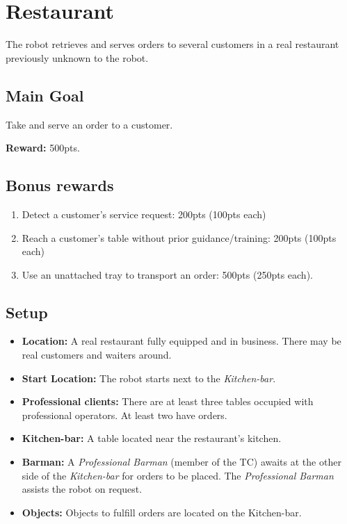 \section{Restaurant}
The robot retrieves and serves orders to several customers in a real restaurant previously unknown to the robot.


\subsection{Main Goal}
Take and serve an order to a customer.

\noindent\textbf{Reward:} 500pts.

\subsection{Bonus rewards}
\begin{enumerate}[nosep]
	\item Detect a customer's service request: 200pts (100pts each)
	\item Reach a customer's table without prior guidance/training: 200pts (100pts each)
	\item Use an unattached tray to transport an order: 500pts (250pts each).
\end{enumerate}

\subsection{Setup}
\begin{itemize}[nosep]
	\item \textbf{Location:} A real restaurant fully equipped and in business.
	There may be real customers and waiters around.

	\item \textbf{Start Location:} The robot starts next to the \emph{Kitchen-bar}.

	\item \textbf{Professional clients:} There are at least three tables occupied with professional operators. At least two have orders.

    \item \textbf{Kitchen-bar:} A table located near the restaurant's kitchen.

	\item \textbf{Barman:} A \emph{Professional Barman} (member of the TC) awaits at the other side of the \emph{Kitchen-bar} for orders to be placed. The \emph{Professional Barman} assists the robot on request.

	\item \textbf{Objects:} Objects to fulfill orders are located on the Kitchen-bar.
\end{itemize}


